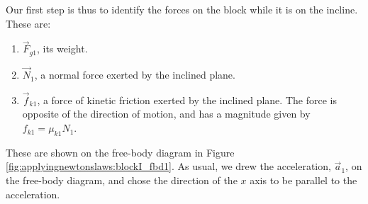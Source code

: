 \begin{example}
Our first step is thus to identify the forces on the block while it is on the incline. These are:
\begin{enumerate}
\item $\vec F_{g1}$, its weight.
\item $\vec N_1$, a normal force exerted by the inclined plane.
\item $\vec f_{k1}$, a force of kinetic friction exerted by the inclined plane. The force is opposite of the direction of motion, and has a magnitude given by $f_{k1}=\mu_{k1}N_1$.
\end{enumerate}
These are shown on the free-body diagram in Figure \ref{fig:applyingnewtonslaws:blockI_fbd1}. As usual, we drew the acceleration, $\vec a_1$, on the free-body diagram, and chose the direction of the $x$ axis to be parallel to the acceleration. 



\end{example}
